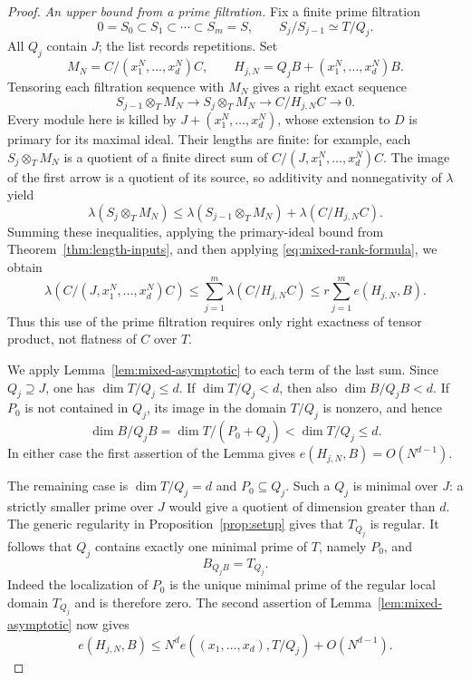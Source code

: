\begin{proof}
\medskip
\noindent\emph{An upper bound from a prime filtration.}
Fix a finite prime filtration
\[
 0=S_0\subset S_1\subset\cdots\subset S_m=S,
 \qquad S_j/S_{j-1}\simeq T/Q_j.
\]
All $Q_j$ contain $J$; the list records repetitions.  Set
\[
 M_N=C/(x_1^N,\ldots,x_d^N)C,
 \qquad H_{j,N}=Q_jB+(x_1^N,\ldots,x_d^N)B.
\]
Tensoring each filtration sequence with $M_N$ gives a right exact
sequence
\[
 S_{j-1}\otimes_T M_N\longrightarrow S_j\otimes_T M_N
                   \longrightarrow C/H_{j,N}C\longrightarrow0.
\]
Every module here is killed by $J+(x_1^N,\ldots,x_d^N)$, whose
extension to $D$ is primary for its maximal ideal.  Their lengths
are finite: for example, each $S_j\otimes_T M_N$ is a quotient of
a finite direct sum of $C/(J,x_1^N,\ldots,x_d^N)C$.
The image of the first arrow is a quotient of its source, so
additivity and nonnegativity of $\lambda$ yield
\[
 \lambda(S_j\otimes_T M_N)
 \leq\lambda(S_{j-1}\otimes_T M_N)+\lambda(C/H_{j,N}C).
\]
Summing these inequalities, applying the primary-ideal bound from
Theorem~\ref{thm:length-inputs}, and then applying
\eqref{eq:mixed-rank-formula}, we obtain
\begin{equation}\label{eq:mixed-filtration-bound}
 \lambda(C/(J,x_1^N,\ldots,x_d^N)C)
 \leq\sum_{j=1}^m\lambda(C/H_{j,N}C)
 \leq r\sum_{j=1}^m e(H_{j,N},B).
\end{equation}
Thus this use of the prime filtration requires only right
exactness of tensor product, not flatness of $C$ over $T$.

We apply Lemma~\ref{lem:mixed-asymptotic} to each term of the last
sum.  Since $Q_j\supseteq J$, one has $\dim T/Q_j\leq d$.
If $\dim T/Q_j<d$, then also $\dim B/Q_jB<d$.  If $P_0$ is not
contained in $Q_j$, its image in the domain $T/Q_j$ is nonzero,
and hence
\[
 \dim B/Q_jB=\dim T/(P_0+Q_j)<\dim T/Q_j\leq d.
\]
In either case the first assertion of the Lemma gives
$e(H_{j,N},B)=O(N^{d-1})$.

The remaining case is $\dim T/Q_j=d$ and $P_0\subseteq Q_j$.
Such a $Q_j$ is minimal over $J$: a strictly smaller prime over
$J$ would give a quotient of dimension greater than $d$.
The generic regularity in Proposition~\ref{prop:setup} gives that
$T_{Q_j}$ is regular.  It follows that $Q_j$ contains exactly one
minimal prime of $T$, namely $P_0$, and
\[
 B_{Q_jB}=T_{Q_j}.
\]
Indeed the localization of $P_0$ is the unique minimal prime of
the regular local domain $T_{Q_j}$ and is therefore zero.
The second assertion of Lemma~\ref{lem:mixed-asymptotic} now gives
\begin{equation}\label{eq:mixed-component-asymptotic}
 e(H_{j,N},B)
 \leq N^d e((x_1,\ldots,x_d),T/Q_j)+O(N^{d-1}).
\end{equation}


\end{proof}
